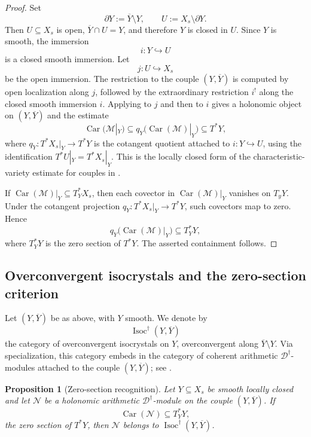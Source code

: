 \documentclass[11pt]{amsart}
\theoremstyle{plain}
\newtheorem{proposition}{Proposition}[section]
\theoremstyle{definition}
\theoremstyle{remark}
\newcommand{\Isoc}{\operatorname{Isoc}}
\newcommand{\Car}{\operatorname{Car}}
\begin{document}
\begin{proof}
Set
\[
  \partial Y:=\overline Y\setminus Y,
  \qquad
  U:=X_s\setminus\partial Y.
\]
Then \(U\subseteq X_s\) is open, \(\overline Y\cap U=Y\), and therefore
\(Y\) is closed in \(U\). Since \(Y\) is smooth, the immersion
\[
  i:Y\hookrightarrow U
\]
is a closed smooth immersion. Let
\[
  j:U\hookrightarrow X_s
\]
be the open immersion. The restriction to the couple \((Y,\overline Y)\) is
computed by open localization along \(j\), followed by the extraordinary
restriction \(i^!\) along the closed smooth immersion \(i\). Applying
 to \(j\) and then
 to \(i\) gives a holonomic object
on \((Y,\overline Y)\) and the estimate
\[
  \Car(\mathcal M|_Y)
  \subseteq
  q_Y\bigl(\Car(\mathcal M)|_Y\bigr)
  \subseteq T^*Y,
\]
where \(q_Y:T^*X_s|_Y\to T^*Y\) is the cotangent quotient attached to
\(i:Y\hookrightarrow U\), using the identification \(T^*U|_Y=T^*X_s|_Y\).
This is the locally closed form of the characteristic-variety estimate for
couples in
\cite[\S2.1, Lemmas 2.1.1--2.1.2]{HuygheSchmidtIntermediate}.

If \(\Car(\mathcal M)|_Y\subseteq T^*_Y X_s\), then each covector in
\(\Car(\mathcal M)|_Y\) vanishes on \(T_yY\). Under the cotangent projection
\(q_Y:T^*X_s|_Y\to T^*Y\), such covectors map to zero. Hence
\[
  q_Y\bigl(\Car(\mathcal M)|_Y\bigr)
  \subseteq T^*_Y Y,
\]
where \(T^*_Y Y\) is the zero section of \(T^*Y\). The asserted containment
follows.
\end{proof}

\subsection{Overconvergent isocrystals and the zero-section criterion}
\label{subsec:overconvergent-isocrystals}

Let \((Y,\overline Y)\) be as above, with \(Y\) smooth. We denote by
\[
  \Isoc^\dagger(Y,\overline Y)
\]
the category of overconvergent isocrystals on \(Y\), overconvergent along
\(\overline Y\setminus Y\). Via specialization, this category embeds in the
category of coherent arithmetic \(\mathscr D^\dagger\)-modules attached to the
couple \((Y,\overline Y)\); see
\cite[Definition 2.1.3 and Theorem 2.1.4]{HuygheSchmidtIntermediate}.

\begin{proposition}[Zero-section recognition]
\label{prop:zero-section-isocrystal}
Let \(Y\subseteq X_s\) be smooth locally closed and let \(\mathcal N\) be a
holonomic arithmetic \(\mathscr D^\dagger\)-module on the couple
\((Y,\overline Y)\). If
\[
  \Car(\mathcal N)\subseteq T^*_Y Y,
\]
the zero section of \(T^*Y\), then \(\mathcal N\) belongs to
\(\Isoc^\dagger(Y,\overline Y)\).
\end{proposition}
\end{document}
